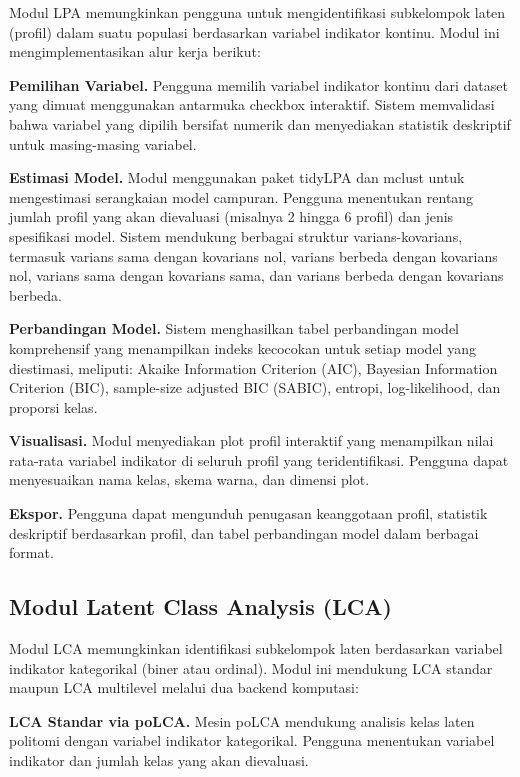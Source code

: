 \documentclass[12pt,a4paper]{article}
\begin{document}
Modul LPA memungkinkan pengguna untuk mengidentifikasi subkelompok laten (profil) dalam suatu populasi berdasarkan variabel indikator kontinu. Modul ini mengimplementasikan alur kerja berikut:

\textbf{Pemilihan Variabel.} Pengguna memilih variabel indikator kontinu dari dataset yang dimuat menggunakan antarmuka checkbox interaktif. Sistem memvalidasi bahwa variabel yang dipilih bersifat numerik dan menyediakan statistik deskriptif untuk masing-masing variabel.

\textbf{Estimasi Model.} Modul menggunakan paket tidyLPA dan mclust untuk mengestimasi serangkaian model campuran. Pengguna menentukan rentang jumlah profil yang akan dievaluasi (misalnya 2 hingga 6 profil) dan jenis spesifikasi model. Sistem mendukung berbagai struktur varians-kovarians, termasuk varians sama dengan kovarians nol, varians berbeda dengan kovarians nol, varians sama dengan kovarians sama, dan varians berbeda dengan kovarians berbeda.

\textbf{Perbandingan Model.} Sistem menghasilkan tabel perbandingan model komprehensif yang menampilkan indeks kecocokan untuk setiap model yang diestimasi, meliputi: Akaike Information Criterion (AIC), Bayesian Information Criterion (BIC), sample-size adjusted BIC (SABIC), entropi, log-likelihood, dan proporsi kelas.

\textbf{Visualisasi.} Modul menyediakan plot profil interaktif yang menampilkan nilai rata-rata variabel indikator di seluruh profil yang teridentifikasi. Pengguna dapat menyesuaikan nama kelas, skema warna, dan dimensi plot.

\textbf{Ekspor.} Pengguna dapat mengunduh penugasan keanggotaan profil, statistik deskriptif berdasarkan profil, dan tabel perbandingan model dalam berbagai format.

\subsection{Modul Latent Class Analysis (LCA)}

Modul LCA memungkinkan identifikasi subkelompok laten berdasarkan variabel indikator kategorikal (biner atau ordinal). Modul ini mendukung LCA standar maupun LCA multilevel melalui dua backend komputasi:

\textbf{LCA Standar via poLCA.} Mesin poLCA mendukung analisis kelas laten politomi dengan variabel indikator kategorikal. Pengguna menentukan variabel indikator dan jumlah kelas yang akan dievaluasi.
\end{document}
